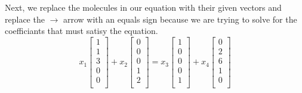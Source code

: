 \documentclass[10pt]{article}
\begin{document}
\begin{multicols}{2}
Next, we replace the molecules in our equation with their given vectors and replace the $\to$ arrow with an equals sign
because we are trying to solve for the coefficiants that must satisy the equation.
\[
x_{1} \left[ \begin{array}{c} 1 \\ 1 \\ 3 \\ 0 \\ 0 \\ \end{array} \right] + 
x_{2} \left[ \begin{array}{c} 0 \\ 0 \\ 0 \\ 1 \\ 2 \\ \end{array} \right] = 
x_{3} \left[ \begin{array}{c} 1 \\ 0 \\ 0 \\ 0 \\ 1 \\ \end{array} \right] +
x_{4} \left[ \begin{array}{c} 0 \\ 2 \\ 6 \\ 1 \\ 0 \\ \end{array} \right]
\]


\end{multicols}
\end{document}
